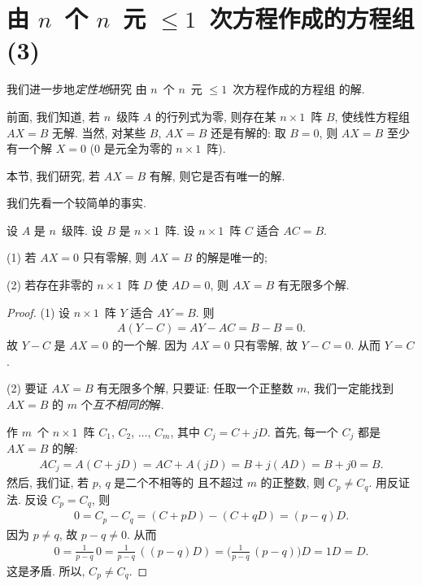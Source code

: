 \section{\texorpdfstring{由 \(n\)~个 \(n\)~元
      \({\leq} 1\)~次方程作成的方程组 (3)}%
  {由 n 个 n 元 ≤1 次方程作成的方程组 (3)}}

\maldevigalegajxo

我们进一步地\emph{定性地}研究%
由 \(n\)~个 \(n\)~元 \({\leq} 1\)~次方程作成的方程组%
的解.

前面, 我们知道,
若 \(n\)~级阵 \(A\) 的行列式为零,
则存在某 \(n \times 1\)~阵 \(B\),
使线性方程组 \(AX = B\) 无解.
当然, 对某些 \(B\),
\(AX = B\) 还是有解的:
取 \(B = 0\),
则 \(AX = B\) 至少有一个解 \(X = 0\)
(\(0\) 是元全为零的 \(n \times 1\)~阵).

本节, 我们研究, 若 \(AX = B\) 有解,
则它是否有唯一的解.

我们先看一个较简单的事实.

\begin{theorem}
    设 \(A\) 是 \(n\)~级阵.
    设 \(B\) 是 \(n \times 1\)~阵.
    设 \(n \times 1\)~阵 \(C\) 适合 \(AC = B\).

    (1)
    若 \(AX = 0\) 只有零解, 则 \(AX = B\) 的解是唯一的;

    (2)
    若存在非零的 \(n \times 1\)~阵 \(D\)
    使 \(AD = 0\),
    则 \(AX = B\) 有无限多个解.
\end{theorem}

\begin{proof}
    (1)
    设 \(n \times 1\)~阵 \(Y\) 适合 \(AY = B\).
    则
    \begin{align*}
        A(Y - C) = AY - AC = B - B = 0.
    \end{align*}
    故 \(Y - C\) 是 \(AX = 0\) 的一个解.
    因为 \(AX = 0\) 只有零解,
    故 \(Y - C = 0\).
    从而 \(Y = C\).

    (2)
    要证 \(AX = B\) 有无限多个解,
    只要证:
    任取一个正整数 \(m\),
    我们一定能找到 \(AX = B\) 的
    \(m\) 个\emph{互不相同的}解.

    作 \(m\)~个 \(n \times 1\)~阵
    \(C_1\), \(C_2\), \(\dots\), \(C_m\),
    其中 \(C_j = C + jD\).
    首先, 每一个 \(C_j\) 都是 \(AX = B\) 的解:
    \begin{align*}
        AC_j = A(C + jD) = AC + A(jD) = B + j(AD) = B + j0 = B.
    \end{align*}
    然后, 我们证,
    若 \(p\), \(q\) 是二个不相等的%
    且不超过 \(m\) 的正整数,
    则 \(C_p \neq C_q\).
    用反证法.
    反设 \(C_p = C_q\),
    则
    \begin{align*}
        0 = C_p - C_q = (C + pD) - (C + qD) = (p - q)D.
    \end{align*}
    因为 \(p \neq q\), 故 \(p - q \neq 0\).
    从而
    \begin{align*}
        0 = \frac{1}{p-q}\, 0
        = \frac{1}{p-q}\, ((p-q)D)
        = \Big( \frac{1}{p-q}\, (p-q) \Big) D
        = 1D
        = D.
    \end{align*}
    这是矛盾.
    所以, \(C_p \neq C_q\).
\end{proof}

